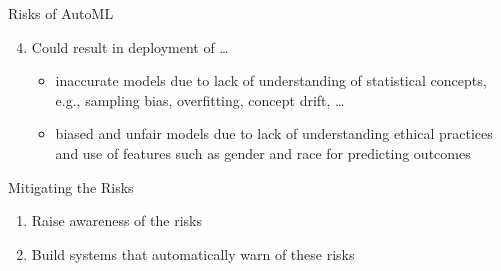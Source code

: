 \begin{frame}[c]{Risks of AutoML}

\begin{enumerate}\setcounter{enumi}{3}
	\item Could result in deployment of \ldots
	\pause
	\begin{itemize}
		\item \alert{inaccurate models} due to lack of understanding of statistical concepts, e.g., sampling bias, overfitting, concept drift, \ldots
		\pause
		\medskip
		\item \alert{biased and unfair models} due to lack of understanding ethical practices and use of features such as gender and race for predicting outcomes
	\end{itemize}
\end{enumerate}

\end{frame}
\begin{frame}[c]{Mitigating the Risks}

\begin{enumerate}
	\item Raise awareness of the risks
	\pause
	\bigskip
	\item Build systems that automatically warn of these risks
\end{enumerate}



\end{frame}


